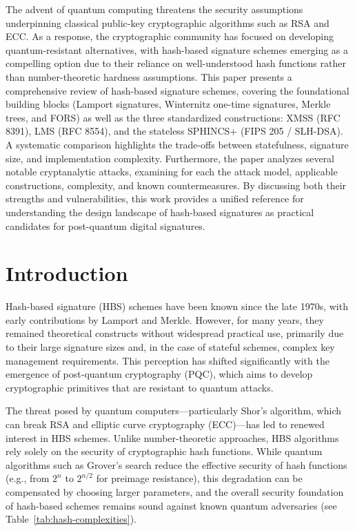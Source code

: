 \documentclass[version=preprint]{iacrcc}
\begin{document}
\begin{textabstract}
  The advent of quantum computing threatens the security assumptions underpinning classical public-key cryptographic algorithms such as RSA and ECC. As a response, the cryptographic community has focused on developing quantum-resistant alternatives, with hash-based signature schemes emerging as a compelling option due to their reliance on well-understood hash functions rather than number-theoretic hardness assumptions. This paper presents a comprehensive review of hash-based signature schemes, covering the foundational building blocks (Lamport signatures, Winternitz one-time signatures, Merkle trees, and FORS) as well as the three standardized constructions: XMSS (RFC 8391), LMS (RFC 8554), and the stateless SPHINCS+ (FIPS 205 / SLH-DSA). A systematic comparison highlights the trade-offs between statefulness, signature size, and implementation complexity. Furthermore, the paper analyzes several notable cryptanalytic attacks, examining for each the attack model, applicable constructions, complexity, and known countermeasures. By discussing both their strengths and vulnerabilities, this work provides a unified reference for understanding the design landscape of hash-based signatures as practical candidates for post-quantum digital signatures.
\end{textabstract}

\section{Introduction}
Hash-based signature (HBS) schemes have been known since the late 1970s, with early contributions by Lamport and Merkle. However, for many years, they remained theoretical constructs without widespread practical use, primarily due to their large signature sizes and, in the case of stateful schemes, complex key management requirements. This perception has shifted significantly with the emergence of post-quantum cryptography (PQC), which aims to develop cryptographic primitives that are resistant to quantum attacks.

The threat posed by quantum computers—particularly Shor's algorithm, which can break RSA and elliptic curve cryptography (ECC)—has led to renewed interest in HBS schemes. Unlike number-theoretic approaches, HBS algorithms rely solely on the security of cryptographic hash functions. While quantum algorithms such as Grover's search reduce the effective security of hash functions (e.g., from $2^n$ to $2^{n/2}$ for preimage resistance), this degradation can be compensated by choosing larger parameters, and the overall security foundation of hash-based schemes remains sound against known quantum adversaries (see Table~\ref{tab:hash-complexities}).
\end{document}
